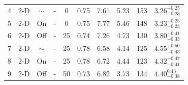 \begin{table}[]
\begin{tabular}{cccccccccc}
        4   & 2-D  & $\sim$ & -         & 0                                                                 & 0.75                                                            & 7.61                                                                  & 5.23                                                             & 153                                                       & $3.26_{-0.23}^{+0.25}$ \\
        5   & 2-D  & On     & -         & 0                                                                 & 0.75                                                            & 7.77                                                                  & 5.46                                                             & 148                                                       & $3.23_{-0.23}^{+0.25}$ \\
        6   & 2-D  & Off    & -         & 25                                                                & 0.74                                                            & 7.26                                                                  & 4.73                                                             & 130                                                       & $3.80_{-0.33}^{+0.41}$ \\
        7   & 2-D  & $\sim$ & -         & 25                                                                & 0.78                                                            & 6.58                                                                  & 4.14                                                             & 125                                                       & $4.55_{-0.43}^{+0.50}$ \\
        8   & 2-D  & On     & -         & 25                                                                & 0.78                                                            & 6.72                                                                  & 4.44                                                             & 123                                                       & $4.32_{-0.41}^{+0.47}$ \\
        9   & 2-D  & Off    & -         & 50                                                                & 0.73                                                            & 6.82                                                                  & 3.73                                                             & 134                                                       & $4.40_{-0.38}^{0.43}$  \\

\end{tabular}
\end{table}
